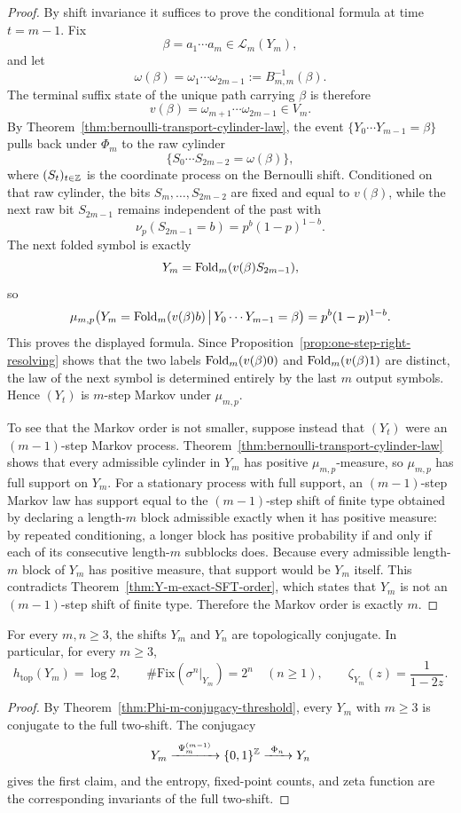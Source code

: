 \begin{proof}
By shift invariance it suffices to prove the conditional formula at time
$t=m-1$.  Fix
\[
\beta=a_1\cdots a_m\in\mathcal L_m(Y_m),
\]
and let
\[
\omega(\beta)=\omega_1\cdots\omega_{2m-1}:=B_{m,m}^{-1}(\beta).
\]
The terminal suffix state of the unique path carrying $\beta$ is therefore
\[
v(\beta)=\omega_{m+1}\cdots\omega_{2m-1}\in V_m.
\]
By Theorem~\ref{thm:bernoulli-transport-cylinder-law}, the event
$\{Y_0\cdots Y_{m-1}=\beta\}$ pulls back under $\Phi_m$ to the raw cylinder
\[
\{S_0\cdots S_{2m-2}=\omega(\beta)\},
\]
where $(S_t)_{t\in\mathbb{Z}}$ is the coordinate process on the Bernoulli shift.
Conditioned on that raw cylinder, the bits
$S_m,\ldots,S_{2m-2}$ are fixed and equal to $v(\beta)$, while the next raw bit
$S_{2m-1}$ remains independent of the past with
\[
\nu_p(S_{2m-1}=b)=p^b(1-p)^{1-b}.
\]
The next folded symbol is exactly
\[
Y_m=\operatorname{Fold}_m(v(\beta)S_{2m-1}),
\]
so
\[
\mu_{m,p}\bigl(
Y_m=\operatorname{Fold}_m(v(\beta)b)\,\big|\,Y_0\cdots Y_{m-1}=\beta
\bigr)
=
p^b(1-p)^{1-b}.
\]
This proves the displayed formula.  Since Proposition~\ref{prop:one-step-right-resolving}
shows that the two labels $\operatorname{Fold}_m(v(\beta)0)$ and $\operatorname{Fold}_m(v(\beta)1)$ are
distinct, the law of the next symbol is determined entirely by the last $m$
output symbols.  Hence $(Y_t)$ is $m$-step Markov under $\mu_{m,p}$.

To see that the Markov order is not smaller, suppose instead that $(Y_t)$ were
an $(m-1)$-step Markov process.  Theorem~\ref{thm:bernoulli-transport-cylinder-law}
shows that every admissible cylinder in $Y_m$ has positive $\mu_{m,p}$-measure,
so $\mu_{m,p}$ has full support on $Y_m$.  For a stationary process with full
support, an $(m-1)$-step Markov law has support equal to the
$(m-1)$-step shift of finite type obtained by declaring a length-$m$ block
admissible exactly when it has positive measure: by repeated conditioning, a
longer block has positive probability if and only if each of its consecutive
length-$m$ subblocks does.  Because every admissible length-$m$ block of $Y_m$
has positive measure, that support would be $Y_m$ itself.  This contradicts
Theorem~\ref{thm:Y-m-exact-SFT-order}, which states that $Y_m$ is not an
$(m-1)$-step shift of finite type.  Therefore the Markov order is exactly $m$.
\end{proof}

\begin{corollary}
\label{cor:Y-m-conjugacy-collapse}
For every $m,n\ge 3$, the shifts $Y_m$ and $Y_n$ are topologically conjugate.
In particular, for every $m\ge 3$,
\[
h_{\mathrm{top}}(Y_m)=\log 2,
\qquad
\#\mathrm{Fix}(\sigma^n|_{Y_m})=2^n
\quad (n\ge 1),
\qquad
\zeta_{Y_m}(z)=\frac{1}{1-2z}.
\]
\end{corollary}

\begin{proof}
By Theorem~\ref{thm:Phi-m-conjugacy-threshold}, every $Y_m$ with $m\ge 3$ is
conjugate to the full two-shift.  The conjugacy
\[
Y_m\xrightarrow{\ \Psi_m^{(m-1)}\ }\{0,1\}^{\ZZ}\xrightarrow{\ \Phi_n\ }Y_n
\]
gives the first claim, and the entropy, fixed-point counts, and zeta function
are the corresponding invariants of the full two-shift.
\end{proof}
